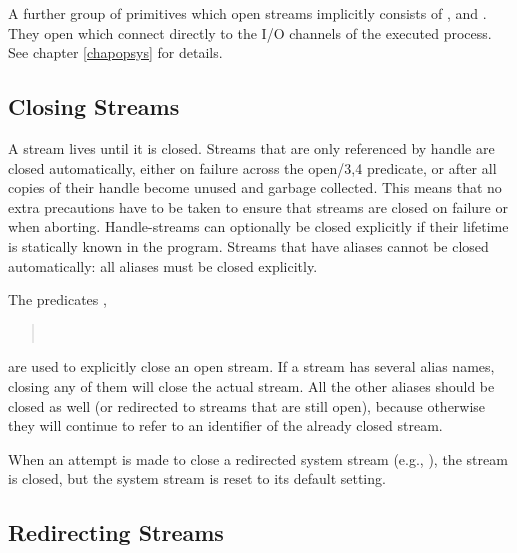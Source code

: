 A further group of primitives which open streams implicitly consists of
,
and .
They open  which connect directly to the I/O channels of
the executed process. See chapter \ref{chapopsys} for details.



\subsection{Closing Streams}

A stream lives until it is closed.  Streams that are only referenced
by handle are closed automatically, either on failure across the
open/3,4 predicate, or after all copies of their handle become unused
and garbage collected.  This means that no extra precautions have to
be taken to ensure that streams are closed on failure or when
aborting.  Handle-streams can optionally be closed explicitly if their
lifetime is statically known in the program.  Streams that have
aliases cannot be closed automatically:  all aliases must be closed
explicitly.

The predicates
,
\begin{quote}
\\
\end{quote}
are used to explicitly close an open stream.
If a stream has several alias names, closing any of them will close
the actual stream. All the other aliases should be closed as well
(or redirected to streams that are still open),
because otherwise they will continue
to refer to an identifier of the already closed stream.

When an attempt is made to close a redirected system stream (e.g.,
),
the stream is closed, but the system stream is reset to its default setting.

\subsection{Redirecting Streams}

